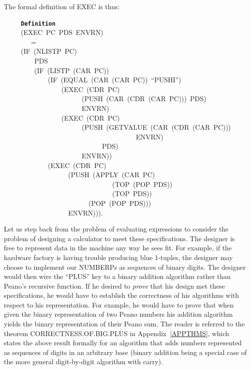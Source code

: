 \documentclass[11pt]{book}
\newenvironment{pubasis}{\begin{flushleft}\ttfamily\small}{\normalsize\rmfamily\end{flushleft}}
\newcommand{\axiomordefinition}[1]{\vspace{6pt}\texttt{\textbf{#1}}}
\newcommand{\pubinlineunderline}[1]{\emph{#1}}
\begin{document}
The formal definition of EXEC is thus:
\begin{pubasis}
~~~~~\axiomordefinition{Definition}\\
~~~~~(EXEC~PC~PDS~ENVRN)\\
~~~~~~~~=\\
~~~~~(IF~(NLISTP~PC)\\
~~~~~~~~~PDS\\
~~~~~~~~~(IF~(LISTP~(CAR~PC))\\
~~~~~~~~~~~~~(IF~(EQUAL~(CAR~(CAR~PC))~``PUSHI'')\\
~~~~~~~~~~~~~~~~~(EXEC~(CDR~PC)\\
~~~~~~~~~~~~~~~~~~~~~~~(PUSH~(CAR~(CDR~(CAR~PC)))~PDS)\\
~~~~~~~~~~~~~~~~~~~~~~~ENVRN)\\
~~~~~~~~~~~~~~~~~(EXEC~(CDR~PC)\\
~~~~~~~~~~~~~~~~~~~~~~~(PUSH~(GETVALUE~(CAR~(CDR~(CAR~PC)))\\
~~~~~~~~~~~~~~~~~~~~~~~~~~~~~~~~~~~~~~~ENVRN)\\
~~~~~~~~~~~~~~~~~~~~~~~~~~~~~PDS)\\
~~~~~~~~~~~~~~~~~~~~~~~ENVRN))\\
~~~~~~~~~~~~~(EXEC~(CDR~PC)\\
~~~~~~~~~~~~~~~~~~~(PUSH~(APPLY~(CAR~PC)\\
~~~~~~~~~~~~~~~~~~~~~~~~~~~~~~~~(TOP~(POP~PDS))\\
~~~~~~~~~~~~~~~~~~~~~~~~~~~~~~~~(TOP~PDS))\\
~~~~~~~~~~~~~~~~~~~~~~~~~(POP~(POP~PDS)))\\
~~~~~~~~~~~~~~~~~~~ENVRN))).\\
\end{pubasis}
Let us step back from the problem of evaluating
expressions to consider the problem of
designing a calculator to meet these specifications.
The designer is free to
represent data in the machine any way he sees fit.
For example, if the hardware factory is having trouble producing blue 1-tuples,
the designer
may choose to implement our NUMBERPs as sequences of binary digits.
The designer would then wire the ``PLUS'' key to a binary addition algorithm
rather than Peano's recursive function.  If he desired to \pubinlineunderline{prove}
that his design met these specifications,
he would have to establish the correctness of his
algorithms with respect to his representation.
For example, he would have to prove that when given
the binary representation of two Peano numbers his addition algorithm
yields the binary representation of their Peano sum.
The reader is referred to the theorem
CORRECTNESS.OF.BIG.PLUS in Appendix~\ref{APPTHMS}, which states the above
result formally for an algorithm that adds numbers represented as sequences
of digits in an arbitrary base (binary addition being a special case
of the more general digit-by-digit algorithm with carry).
\end{document}
